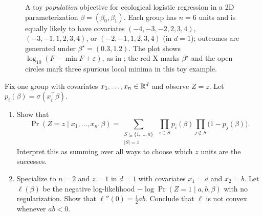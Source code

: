 \documentclass[11pt]{article}
\begin{document}
\begin{figure}[H]
  \centering
  
  \caption{A toy \emph{population} objective for ecological logistic regression in a 2D parameterization $\beta=(\beta_0,\beta_1)$.
  Each group has $n=6$ units and is equally likely to have covariates $(-4,-3,-2,2,3,4)$, $(-3,-1,1,2,3,4)$, or $(-2,-1,1,2,3,4)$ (in $d=1$); outcomes are generated under $\beta^\star=(0.3,1.2)$.
  The plot shows $\log_{10}(F-\min F+\varepsilon)$, as in ; the red X marks $\beta^\star$ and the open circles mark three spurious local minima in this toy example.}
  \label{fig:eco-logistic-pop-landscape}
\end{figure}

\begin{exercise}
\label{ex:eco-logistic-nonconvex}
Fix one group with covariates $x_1,\dots,x_n\in\mathbb{R}^d$ and observe $Z=z$.
Let $p_i(\beta)=\sigma(x_i^\top\beta)$.
\begin{enumerate}[leftmargin=*]
  \item Show that
  \[
    \Pr(Z=z\mid x_1,\dots,x_n,\beta)
    =
    \sum_{\substack{S\subseteq\{1,\dots,n\}\\|S|=z}}
    \ \prod_{i\in S} p_i(\beta)\prod_{j\notin S}\bigl(1-p_j(\beta)\bigr).
  \]
  Interpret this as summing over all ways to choose which $z$ units are the successes.
  \item Specialize to $n=2$ and $z=1$ in $d=1$ with covariates $x_1=a$ and $x_2=b$.
  Let $\ell(\beta)$ be the negative log-likelihood $-\log \Pr(Z=1\mid a,b,\beta)$ with no regularization.
  Show that $\ell''(0)=\tfrac12 ab$.
  Conclude that $\ell$ is not convex whenever $ab<0$.
\end{enumerate}
\end{exercise}
\end{document}
